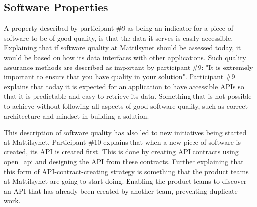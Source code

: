 

\subsection{Software Properties} \label{sec:software_properties}
A property described by participant \#9 as being an indicator for a piece of software to be of good quality, is that the data it serves is easily accessible. Explaining that if software quality at Mattilsynet should be assessed today, it would be based on how its data interfaces with other applications. Such quality assurance methods are described as important by participant \#9: "It is extremely important to ensure that you have quality in your solution". Participant \#9 explains that today it is expected for an application to have accessible APIs so that it is predictable and easy to retrieve its data. Something that is not possible to achieve without following all aspects of good software quality, such as correct architecture and mindset in building a solution. 


This description of software quality has also led to new initiatives being started at Mattilsynet. Participant \#10 explains that when a new piece of software is created, its API is created first. This is done by creating API contracts using \gls{open_api} and designing the API from these contracts. Further explaining that this form of API-contract-creating strategy is something that the product teams at Mattilsynet are going to start doing. Enabling the product teams to discover an API that has already been created by another team, preventing duplicate work.

